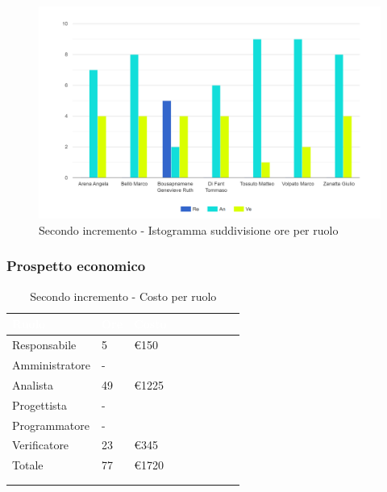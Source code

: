 {{\begin{longtable}{C{.4\freewidth} C{.1\freewidth} C{.1\freewidth} C{.1\freewidth} C{.1\freewidth} C{.1\freewidth} C{.1\freewidth} C{.1\freewidth} C{.1\freewidth}}
      \end{longtable} 
      \begin{figure}[H]
        \includegraphics[width=15cm]{sezioni/images/secondo.png}
        \centering
        \caption{Secondo incremento - Istogramma suddivisione ore per ruolo}
     \end{figure}
      
    }
    

    \subsubsection{Prospetto economico}
    {
        \setlength{\freewidth}{\dimexpr\textwidth-30\tabcolsep}
        \renewcommand{\arraystretch}{1.0}
        \setlength{\aboverulesep}{0pt}
        \setlength{\belowrulesep}{0pt}
        \begin{longtable}{C{.4\freewidth} C{.2\freewidth} C{.2\freewidth} C{.2\freewidth} C{.2\freewidth} C{.2\freewidth} C{.2\freewidth} C{.2\freewidth} C{.2\freewidth}}
          \toprule
        \textcolor{white}{\textbf{Ruolo}}&
        \textcolor{white}{\textbf{Ore}}&
        \textcolor{white}{\textbf{Costo}}\\
        \toprule
        \endhead
            
        Responsabile  & 5 & \euro150\\        
        Amministratore  & -&  \\        
        Analista &49 & \euro1225\\        
        Progettista &- &\\        
        Programmatore &- & \\        
        Verificatore &23 &\euro345\\        
        Totale&77&\euro1720\\
        \bottomrule
      	\\
        \caption{Secondo incremento - Costo per ruolo}


\end{longtable}}}
